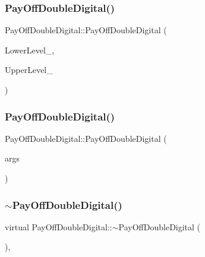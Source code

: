 \hypertarget{classPayOffDoubleDigital_a2638053513b5df1016d3b57162a02bbd}{}\label{classPayOffDoubleDigital_a2638053513b5df1016d3b57162a02bbd} 
\subsubsection{\texorpdfstring{Pay\+Off\+Double\+Digital()}{PayOffDoubleDigital()}\hspace{0.1cm}{\footnotesize\ttfamily [2/3]}}
{\footnotesize\ttfamily Pay\+Off\+Double\+Digital\+::\+Pay\+Off\+Double\+Digital (\begin{DoxyParamCaption}\item[{double}]{Lower\+Level\+\_\+,  }\item[{double}]{Upper\+Level\+\_\+ }\end{DoxyParamCaption})}

\hypertarget{classPayOffDoubleDigital_a55e59bf193a3d4a6a57ccdf0095cf08f}{}\label{classPayOffDoubleDigital_a55e59bf193a3d4a6a57ccdf0095cf08f} 
\subsubsection{\texorpdfstring{Pay\+Off\+Double\+Digital()}{PayOffDoubleDigital()}\hspace{0.1cm}{\footnotesize\ttfamily [3/3]}}
{\footnotesize\ttfamily Pay\+Off\+Double\+Digital\+::\+Pay\+Off\+Double\+Digital (\begin{DoxyParamCaption}\item[{const \hyperlink{classMJArray}{M\+J\+Array} \&}]{args }\end{DoxyParamCaption})}

\hypertarget{classPayOffDoubleDigital_adc7cd94c9210b08afb93f6771bef2e10}{}\label{classPayOffDoubleDigital_adc7cd94c9210b08afb93f6771bef2e10} 
\subsubsection{\texorpdfstring{$\sim$\+Pay\+Off\+Double\+Digital()}{~PayOffDoubleDigital()}\hspace{0.1cm}{\footnotesize\ttfamily [2/2]}}
{\footnotesize\ttfamily virtual Pay\+Off\+Double\+Digital\+::$\sim$\+Pay\+Off\+Double\+Digital (\begin{DoxyParamCaption}{ }\end{DoxyParamCaption})\hspace{0.3cm}{\ttfamily [inline]}, {\ttfamily [virtual]}}



